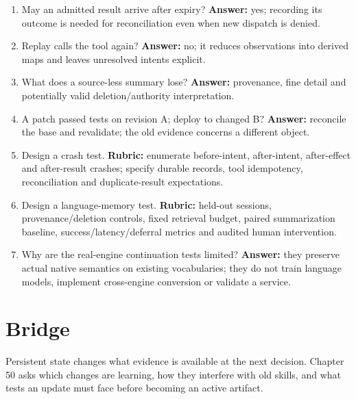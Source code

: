 \begin{enumerate}
\item May an admitted result arrive after expiry? \textbf{Answer:} yes;
recording its outcome is needed for reconciliation even when new dispatch is denied.
\item Replay calls the tool again? \textbf{Answer:} no; it reduces observations
into derived maps and leaves unresolved intents explicit.
\item What does a source-less summary lose? \textbf{Answer:} provenance,
fine detail and potentially valid deletion/authority interpretation.
\item A patch passed tests on revision A; deploy to changed B? \textbf{Answer:}
reconcile the base and revalidate; the old evidence concerns a different object.
\item Design a crash test. \textbf{Rubric:} enumerate before-intent,
after-intent, after-effect and after-result crashes; specify durable records,
tool idempotency, reconciliation and duplicate-result expectations.
\item Design a language-memory test. \textbf{Rubric:} held-out sessions,
provenance/deletion controls, fixed retrieval budget, paired summarization baseline,
success/latency/deferral metrics and audited human intervention.
\item Why are the real-engine continuation tests limited? \textbf{Answer:}
they preserve actual native semantics on existing vocabularies; they do not
train language models, implement cross-engine conversion or validate a service.
\end{enumerate}

\section{Bridge}
Persistent state changes what evidence is available at the next decision.
Chapter 50 asks which changes are learning, how they interfere with old skills,
and what tests an update must face before becoming an active artifact.
